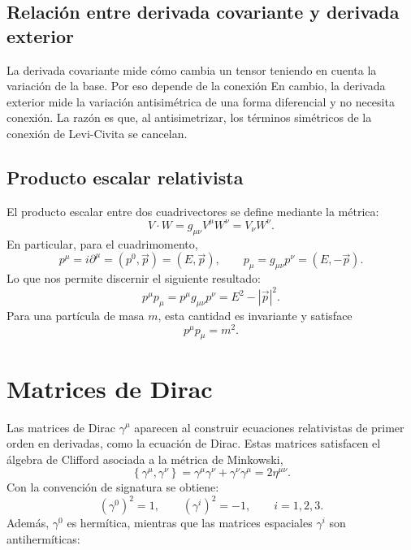 \documentclass[a4paper,11pt]{book} %
\begin{document}
\subsection*{Relación entre derivada covariante y derivada exterior}
\noindent
La derivada covariante mide cómo cambia un tensor teniendo en cuenta la
variación de la base. Por eso depende de la conexión
\medskip\newline
En cambio, la derivada exterior mide la variación antisimétrica de una forma
diferencial y no necesita conexión. La razón es que, al antisimetrizar, los términos simétricos de la conexión de Levi-Civita se cancelan.
\subsection{Producto escalar relativista}
\noindent
El producto escalar entre dos cuadrivectores se define mediante la métrica:
\begin{equation}
    V\cdot W
    =
    g_{\mu\nu}V^\mu W^\nu
    =
    V_\nu W^\nu.
\end{equation}
\noindent
En particular, para el cuadrimomento,
\begin{equation}
    p^\mu = i\partial^\mu = (p^0,\vec{p}) = (E,\vec{p}),
\qquad
    p_\mu = g_{\mu\nu}p^\nu = (E,-\vec{p}).
\end{equation}
\noindent
Lo que nos permite discernir el siguiente resultado:
\begin{equation}
    p^\mu p_\mu
    =
    p^\mu g_{\mu\nu}p^\nu
    =
    E^2 - |\vec{p}|^2.
\end{equation}
\noindent
Para una partícula de masa \(m\), esta cantidad es invariante y satisface
\begin{equation}
    p^\mu p_\mu = m^2.
\end{equation}
\section{Matrices de Dirac}
\noindent
Las matrices de Dirac \(\gamma^\mu\) aparecen al construir ecuaciones
relativistas de primer orden en derivadas, como la ecuación de Dirac. Estas
matrices satisfacen el álgebra de Clifford asociada a la métrica de Minkowski,
\begin{equation}
    \left\{
        \gamma^\mu,\gamma^\nu
    \right\}
    =
    \gamma^\mu\gamma^\nu
    +
    \gamma^\nu\gamma^\mu
    =
    2\eta^{\mu\nu}.
\end{equation}
\noindent
Con la convención de signatura se obtiene:
\begin{equation}
    \left(\gamma^0\right)^2 = 1,
    \qquad
    \left(\gamma^i\right)^2 = -1,
    \qquad i=1,2,3.
\end{equation}
\noindent
Además, \(\gamma^0\) es hermítica, mientras que las matrices espaciales
\(\gamma^i\) son antihermíticas:
\end{document}
